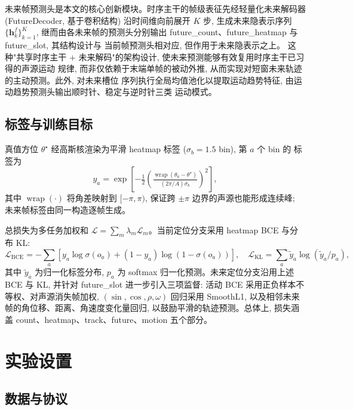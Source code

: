 \documentclass[UTF8,a4paper,11pt]{ctexart}
\newcommand{\wrap}{\operatorname{wrap}}
\begin{document}
未来帧预测头是本文的核心创新模块。时序主干的帧级表征先经轻量化未来解码器 (FutureDecoder,
基于卷积结构) 沿时间维向前展开 $K$ 步, 生成未来隐表示序列 $\{\mathbf{h}^f_k\}_{k=1}^{K}$,
继而由各未来帧的预测头分别输出 future\_count、future\_heatmap 与 future\_slot, 其结构设计与
当前帧预测头相对应, 但作用于未来隐表示之上。
这种"共享时序主干 $+$ 未来解码"的架构设计, 使未来预测能够有效复用时序主干已习得的声源运动
规律, 而非仅依赖于末端单帧的被动外推, 从而实现对短窗未来轨迹的主动预测。此外, 对未来槽位
序列执行全局均值池化以提取运动趋势特征, 由运动趋势预测头输出顺时针、稳定与逆时针三类
运动模式。

\subsection{标签与训练目标}

真值方位 $\theta^\star$ 经高斯核渲染为平滑 heatmap 标签 ($\sigma_b{=}1.5$ bin), 第 $a$ 个 bin 的
标签为
\begin{equation}
  y_a=\exp\!\left[-\tfrac{1}{2}\!\left(\tfrac{\wrap(\theta_a-\theta^\star)}{(2\pi/A)\sigma_b}\right)^{\!2}\right],
\end{equation}
其中 $\wrap(\cdot)$ 将角差映射到 $[-\pi,\pi)$, 保证跨 $\pm\pi$ 边界的声源也能形成连续峰;
未来帧标签由同一构造逐帧生成。

总损失为多任务加权和 $\mathcal{L}=\sum_m \lambda_m\mathcal{L}_m$。当前定位分支采用 heatmap BCE
与分布 KL:
\begin{equation}
  \mathcal{L}_\mathrm{BCE}=-\textstyle\sum_a[y_a\log\sigma(o_a)+(1-y_a)\log(1-\sigma(o_a))],
  \quad
  \mathcal{L}_\mathrm{KL}=\textstyle\sum_a \tilde{y}_a\log(\tilde{y}_a/p_a),
\end{equation}
其中 $\tilde{y}_a$ 为归一化标签分布, $p_a$ 为 softmax 归一化预测。未来定位分支沿用上述 BCE 与 KL,
并针对 future\_slot 进一步引入三项监督: 活动 BCE 采用正负样本不等权、对声源消失帧加权,
$(\sin,\cos,\rho,\omega)$ 回归采用 SmoothL1, 以及相邻未来帧的角位移、距离、角速度变化量回归,
以鼓励平滑的轨迹预测。总体上, 损失涵盖 count、heatmap、track、future、motion 五个部分。

\section{实验设置}

\subsection{数据与协议}
\end{document}
